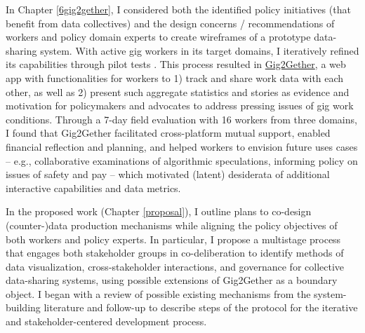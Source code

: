 
In Chapter \ref{6gig2gether}, I considered both the identified policy initiatives (that benefit from data collectives) and the design concerns / recommendations of workers and policy domain experts to create wireframes of a prototype data-sharing system. With active gig workers in its target domains, I iteratively refined its capabilities through pilot tests \cite{gig2gether}. 
This process resulted in \href{https://gigshare.web.app/}{Gig2Gether}, a web app with functionalities for workers to 1) track and share work data with each other, as well as 2) present such aggregate statistics and stories as evidence and motivation for policymakers and advocates to address pressing issues of gig work conditions. Through a 7-day field evaluation with 16 workers from three domains, I found that Gig2Gether facilitated cross-platform mutual support, enabled financial reflection and planning, and helped workers to envision future uses cases -- e.g., collaborative examinations of algorithmic speculations, informing policy on issues of safety and pay -- which motivated (latent) desiderata of additional interactive capabilities and data metrics.

In the proposed work (Chapter \ref{proposal}), I outline plans to co-design (counter-)data production mechanisms while aligning the policy objectives of both workers and policy experts. In particular, I propose a multistage process that engages both stakeholder groups in co-deliberation to identify methods of data visualization, cross-stakeholder interactions, and governance for collective data-sharing systems, using possible extensions of Gig2Gether as a boundary object. I began with a review of possible existing mechanisms from the system-building literature and follow-up to describe steps of the protocol for the iterative and stakeholder-centered development process.

